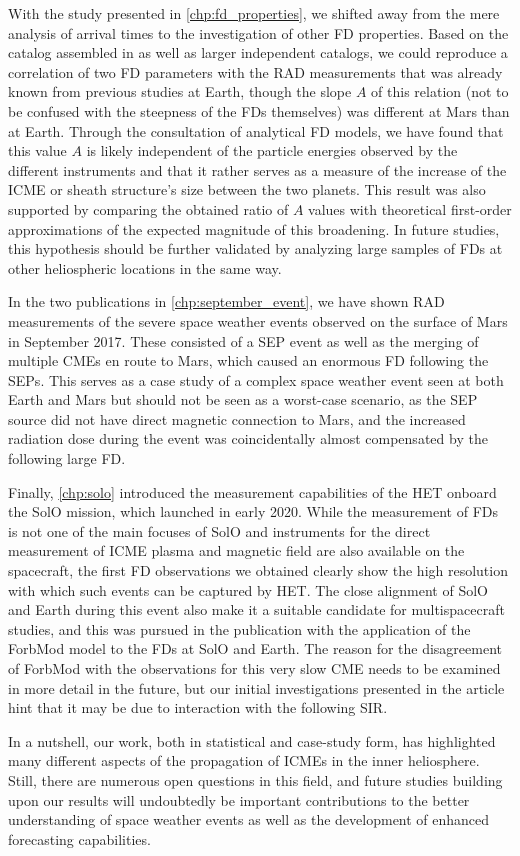 With the study presented in \autoref{chp:fd_properties}, we shifted away from the mere analysis of arrival times to the investigation of other \ac{FD} properties. Based on the catalog assembled in \citet{Forstner-2019} as well as larger independent catalogs, we could reproduce a correlation of two \ac{FD} parameters with the \ac{RAD} measurements that was already known from previous studies at Earth, though the slope $A$ of this relation (not to be confused with the steepness of the \acp{FD} themselves) was different at Mars than at Earth. Through the consultation of analytical \ac{FD} models, we have found that this value $A$ is likely independent of the particle energies observed by the different instruments and that it rather serves as a measure of the increase of the \ac{ICME} or sheath structure's size between the two planets. This result was also supported by comparing the obtained ratio of $A$ values with theoretical first-order approximations of the expected magnitude of this broadening. In future studies, this hypothesis should be further validated by analyzing large samples of \acp{FD} at other heliospheric locations in the same way.

In the two publications in \autoref{chp:september_event}, we have shown \ac{RAD} measurements of the severe space weather events observed on the surface of Mars in September 2017. These consisted of a \ac{SEP} event as well as the merging of multiple \acp{CME} en route to Mars, which caused an enormous \ac{FD} following the \acp{SEP}. This serves as a case study of a complex space weather event seen at both Earth and Mars but should not be seen as a worst-case scenario, as the \ac{SEP} source did not have direct magnetic connection to Mars, and the increased radiation dose during the event was coincidentally almost compensated by the following large \ac{FD}.

Finally, \autoref{chp:solo} introduced the measurement capabilities of the \ac{HET} onboard the \ac{SolO} mission, which launched in early 2020. While the measurement of \acp{FD} is not one of the main focuses of \ac{SolO} and instruments for the direct measurement of \ac{ICME} plasma and magnetic field are also available on the spacecraft, the first \ac{FD} observations we obtained clearly show the high resolution with which such events can be captured by \ac{HET}. The close alignment of \ac{SolO} and Earth during this event also make it a suitable candidate for multispacecraft studies, and this was pursued in the publication with the application of the \acs{ForbMod} model to the \acp{FD} at \ac{SolO} and Earth. The reason for the disagreement of \acs{ForbMod} with the observations for this very slow \ac{CME} needs to be examined in more detail in the future, but our initial investigations presented in the article hint that it may be due to interaction with the following \acl{SIR}.

In a nutshell, our work, both in statistical and case-study form, has highlighted many different aspects of the propagation of \acp{ICME} in the inner heliosphere. Still, there are numerous open questions in this field, and future studies building upon our results will undoubtedly be important contributions to the better understanding of space weather events as well as the development of enhanced forecasting capabilities.